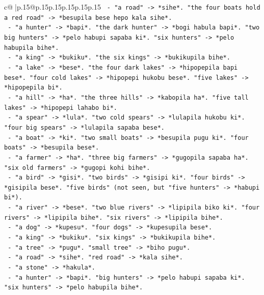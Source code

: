 \documentclass{article}
\begin{document}
{\begin{supertabular}{c@{$\;$}|p{.15\linewidth}@{}p{.15\linewidth}p{.15\linewidth}p{.15\linewidth}p{.15\linewidth}p{.15\linewidth}}
{{{\texttt{            {-} "a road" {-}> *sihe*. "the four boats hold a red road" {-}> *besupila bese hepo kala sihe*.} \\
\texttt{            {-} "a hunter" {-}> *bapi*. "the dark hunter" {-}> *bogi habula bapi*. "two big hunters" {-}> *pelo habupi sapaba ki*. "six hunters" {-}> *pelo habupila bihe*.} \\
\texttt{            {-} "a king" {-}> *bukiku*. "the six kings" {-}> *bukikupila bihe*.} \\
\texttt{            {-} "a lake" {-}> *bese*. "the four dark lakes" {-}> *hipopepila bapi bese*. "four cold lakes" {-}> *hipopepi hukobu bese*. "five lakes" {-}> *hipopepila bi*.} \\
\texttt{            {-} "a hill" {-}> *ha*. "the three hills" {-}> *kabopila ha*. "five tall lakes" {-}> *hipopepi lahabo bi*.} \\
\texttt{            {-} "a spear" {-}> *lula*. "two cold spears" {-}> *lulapila hukobu ki*. "four big spears" {-}> *lulapila sapaba bese*.} \\
\texttt{            {-} "a boat" {-}> *ki*. "two small boats" {-}> *besupila pugu ki*. "four boats" {-}> *besupila bese*.} \\
\texttt{            {-} "a farmer" {-}> *ha*. "three big farmers" {-}> *gugopila sapaba ha*. "six old farmers" {-}> *gugopi kohi bihe*.} \\
\texttt{            {-} "a bird" {-}> *gisi*. "two birds" {-}> *gisipi ki*. "four birds" {-}> *gisipila bese*. "five birds" (not seen, but "five hunters" {-}> *habupi bi*).} \\
\texttt{            {-} "a river" {-}> *bese*. "two blue rivers" {-}> *lipipila biko ki*. "four rivers" {-}> *lipipila bihe*. "six rivers" {-}> *lipipila bihe*.} \\
\texttt{            {-} "a dog" {-}> *kupesu*. "four dogs" {-}> *kupesupila bese*.} \\
\texttt{            {-} "a king" {-}> *bukiku*. "six kings" {-}> *bukikupila bihe*.} \\
\texttt{            {-} "a tree" {-}> *pugu*. "small tree" {-}> *biho pugu*.} \\
\texttt{            {-} "a road" {-}> *sihe*. "red road" {-}> *kala sihe*.} \\
\texttt{            {-} "a stone" {-}> *hakula*.} \\
\texttt{            {-} "a hunter" {-}> *bapi*. "big hunters" {-}> *pelo habupi sapaba ki*. "six hunters" {-}> *pelo habupila bihe*.} \\
}}}
\end{supertabular}}
\end{document}
